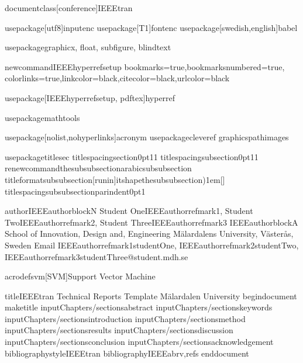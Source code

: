 documentclass[conference]{IEEEtran}

usepackage[utf8]{inputenc}
usepackage[T1]{fontenc}
usepackage[swedish,english]{babel}

usepackage{graphicx, float, subfigure, blindtext}

newcommandIEEEhyperrefsetup{
bookmarks=true,bookmarksnumbered=true,%
colorlinks=true,linkcolor={black},citecolor={black},urlcolor={black}%
}

usepackage[IEEEhyperrefsetup, pdftex]{hyperref}

usepackage{mathtools}

usepackage[nolist,nohyperlinks]{acronym}
usepackage{cleveref}
graphicspath{{images}}

usepackage{titlesec}
titlespacing{section}{0pt}{1}{1}
titlespacing{subsection}{0pt}{1}{1}
renewcommand{thesubsubsection}{arabic{subsubsection}}
titleformat{subsubsection}[runin]{itshape}{thesubsubsection)}{1em}{}[]
titlespacing{subsubsection}{parindent}{0pt}{1}

author{IEEEauthorblockN{ %
Student OneIEEEauthorrefmark{1},
Student TwoIEEEauthorrefmark{2}, 
Student ThreeIEEEauthorrefmark{3}
}
IEEEauthorblockA{
School of Innovation, Design and, Engineering
Mälardalens University, Västerås, Sweden
Email
IEEEauthorrefmark{1}studentOne, 
IEEEauthorrefmark{2}studentTwo,
IEEEauthorrefmark{3}studentThree@student.mdh.se
}}

acrodef{svm}[SVM]{Support Vector Machine}

title{IEEEtran Technical Reports Template
Mälardalen University}
begin{document}
maketitle
input{Chapters/sectionsabstract}
input{Chapters/sectionskeywords}
input{Chapters/sectionsintroduction}
input{Chapters/sectionsmethod}
input{Chapters/sectionsresults}
input{Chapters/sectionsdiscussion}
input{Chapters/sectionsconclusion}
input{Chapters/sectionsacknowledgement}
bibliographystyle{IEEEtran}
bibliography{IEEEabrv,refs}
end{document}